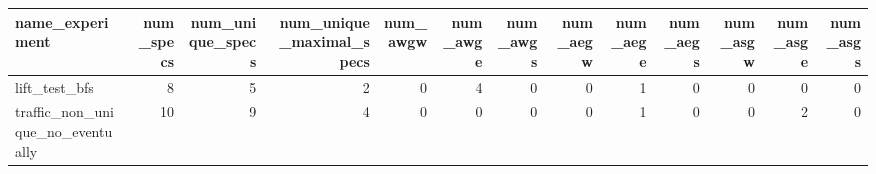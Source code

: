 \begin{tabular}{lrrrrrrrrrrrr}
\toprule
                 name\_experiment &  num\_specs &  num\_unique\_specs &  num\_unique\_maximal\_specs &  num\_awgw &  num\_awge &  num\_awgs &  num\_aegw &  num\_aege &  num\_aegs &  num\_asgw &  num\_asge &  num\_asgs \\
\midrule
                   lift\_test\_bfs &          8 &                 5 &                         2 &         0 &         4 &         0 &         0 &         1 &         0 &         0 &         0 &         0 \\
traffic\_non\_unique\_no\_eventually &         10 &                 9 &                         4 &         0 &         0 &         0 &         0 &         1 &         0 &         0 &         2 &         0 \\
\bottomrule
\end{tabular}
